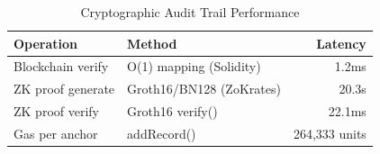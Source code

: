 \begin{table}[h]\centering
\caption{Cryptographic Audit Trail Performance}
\label{tab:crypto}
\begin{tabular}{llr}
\toprule
Operation & Method & Latency \\
\midrule
Blockchain verify & O(1) mapping (Solidity) & 1.2ms \\
ZK proof generate & Groth16/BN128 (ZoKrates) & 20.3s \\
ZK proof verify & Groth16 verify() & 22.1ms \\
Gas per anchor & addRecord() & 264,333 units \\
\bottomrule
\end{tabular}
\end{table}